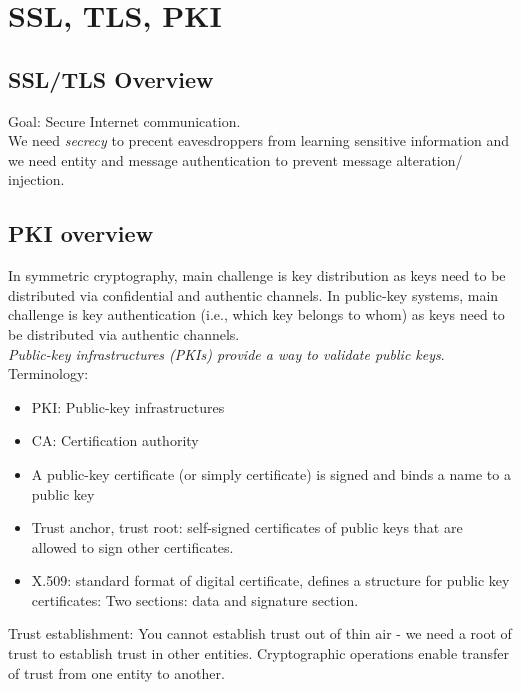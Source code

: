 \documentclass[11pt,oneside,a4paper]{article}
\begin{document}
\newpage

\section{SSL, TLS, PKI}

\subsection{SSL/TLS Overview}

Goal: Secure Internet communication.\\
We need \textit{secrecy} to precent eavesdroppers from learning sensitive information and we need entity and message authentication to prevent message alteration/ injection.

\subsection{PKI overview}

In symmetric cryptography, main challenge is key distribution as keys need to be distributed via confidential and authentic channels. In public-key systems, main challenge is key authentication (i.e., which key belongs to whom) as keys need to be distributed via authentic channels.\\
\textit{Public-key infrastructures (PKIs) provide a way to validate public keys}.\\

Terminology: 

\vspace{-\topsep}
\begin{itemize}
	\setlength{\itemsep}{0pt}
	\setlength{\parskip}{0pt}
	\item PKI: Public-key infrastructures
	\item CA: Certification authority
	\item A public-key certificate (or simply certificate) is signed and binds a name to a public key \item Trust anchor, trust root: self-signed certificates of public keys that are allowed to sign other certificates.
	\item X.509: standard format of digital certificate, defines a structure for public key certificates: Two sections: data and signature section.
\end{itemize}
\vspace{-\topsep}

Trust establishment: You cannot establish trust out of thin air - we need a root of trust to establish trust in other entities. Cryptographic operations enable transfer of trust from one entity to another.
\end{document}

